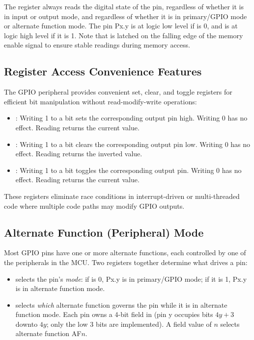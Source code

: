 The  register always reads the digital state of the pin, regardless of whether it is in input or output mode, and regardless of whether it is in primary/GPIO mode or alternate function mode. The pin Px.y is at logic low level if  is 0, and is at logic high level if it is 1. Note that  is latched on the falling edge of the memory enable signal to ensure stable readings during memory access.

\subsection{Register Access Convenience Features}

The GPIO peripheral provides convenient set, clear, and toggle registers for efficient bit manipulation without read-modify-write operations:

\begin{itemize}
\item {}: Writing 1 to a bit sets the corresponding output pin high. Writing 0 has no effect. Reading returns the current  value.
\item {}: Writing 1 to a bit clears the corresponding output pin low. Writing 0 has no effect. Reading returns the inverted  value.
\item {}: Writing 1 to a bit toggles the corresponding output pin. Writing 0 has no effect. Reading returns the current  value.
\end{itemize}

These registers eliminate race conditions in interrupt-driven or multi-threaded code where multiple code paths may modify GPIO outputs.


\subsection{Alternate Function (Peripheral) Mode}

Most GPIO pins have one or more alternate functions, each controlled by one of the peripherals in the MCU. Two registers together determine what drives a pin:

\begin{itemize}
\item {} selects the pin's \emph{mode}: if  is 0, Px.y is in primary/GPIO mode; if it is 1, Px.y is in alternate function mode.
\item {} selects \emph{which} alternate function governs the pin while it is in alternate function mode. Each pin owns a 4-bit field in  (pin y occupies bits $4y{+}3$ downto $4y$; only the low 3 bits are implemented). A field value of $n$ selects alternate function AF$n$.
\end{itemize}

